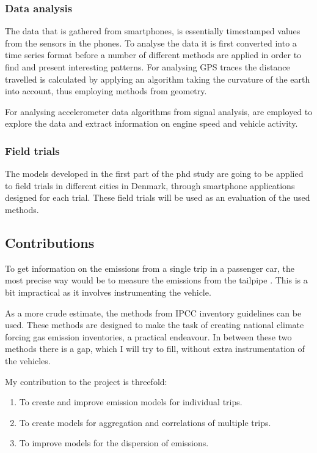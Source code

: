 \subsubsection{Data analysis}
The data that is gathered from smartphones, is essentially timestamped values from the sensors in the phones. To analyse the data it is first converted into a time series format before a number of different methods are applied in order to find and present interesting patterns. For analysing GPS traces the distance travelled is calculated by applying an algorithm taking the curvature of the earth into account, thus employing methods from geometry.

For analysing accelerometer data algorithms from signal analysis, are employed to explore the data and extract  information on engine speed and vehicle activity.
\subsubsection{Field trials}
The models developed in the first part of the phd study are going to be applied to field trials in different cities in Denmark, through smartphone applications designed for each trial. These field trials will be used as an evaluation of the used methods.

\subsection{Contributions}
To get information on the emissions from a single trip in a passenger car, the most precise way would be to measure the emissions from the tailpipe \cite{Frey}. This is a bit impractical as it involves instrumenting the vehicle.

As a more crude estimate, the methods from IPCC inventory guidelines can be used. These methods are designed to make the task of creating national climate forcing gas emission inventories, a practical endeavour. In between these two methods there is a gap, which I will try to fill, without extra instrumentation of the vehicles.

My contribution to the project is threefold:
\begin{enumerate}
  	\item To create and improve emission models for individual trips.
  	\item To create models for aggregation and correlations of multiple trips.
  	\item To improve models for the dispersion of emissions.
\end{enumerate}

